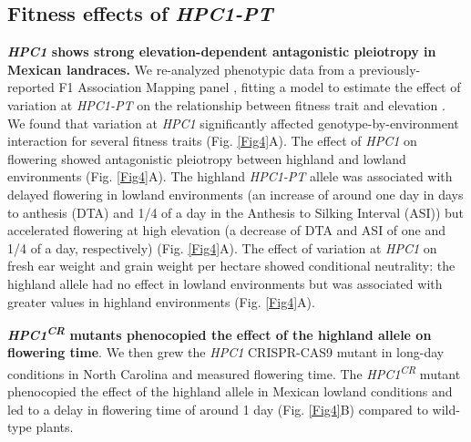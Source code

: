 \documentclass[9pt,twocolumn,twoside,lineno]{BioRxiv}
\begin{document}
\subsection{Fitness effects of \textit{HPC1-PT}}
\textbf{\textit{HPC1} shows strong elevation-dependent antagonistic pleiotropy in Mexican landraces.} 
We re-analyzed phenotypic data from a previously-reported F1 Association Mapping panel \cite{Romero_Navarro2017-cn} \cite{Gates2019-xu}, fitting a model to estimate the effect of variation at \textit{HPC1-PT} on the relationship between fitness trait and elevation \cite{Runcie2019-Gr}. 
We found that variation at \textit{HPC1} significantly affected genotype-by-environment interaction for several fitness traits (Fig. \ref{Fig4}A). 
The effect of \textit{HPC1} on flowering showed antagonistic pleiotropy between highland and lowland environments (Fig. \ref{Fig4}A). 
The highland \textit{HPC1-PT} allele was associated with delayed flowering in lowland environments (an increase of around one day in days to anthesis (DTA)  and 1/4 of a day in the  Anthesis to Silking Interval (ASI)) but accelerated flowering at high elevation (a decrease of DTA and ASI of one and 1/4 of a day, respectively) (Fig. \ref{Fig4}A).
The effect of  variation at \textit{HPC1} on fresh ear weight and grain weight per hectare showed conditional neutrality: the highland allele had no effect in lowland environments but was associated with greater values in highland environments (Fig. \ref{Fig4}A).

\textbf{\textit{HPC1\textsuperscript{CR}} mutants phenocopied the effect of the highland allele on flowering time}.
We then grew the \textit{HPC1} CRISPR-CAS9 mutant in long-day conditions in North Carolina and measured flowering time. 
The \textit{HPC1\textsuperscript{CR}} mutant phenocopied the effect of the highland allele in Mexican lowland conditions and led to a delay in flowering time of around 1 day (Fig. \ref{Fig4}B) compared to wild-type plants. 
\end{document}
